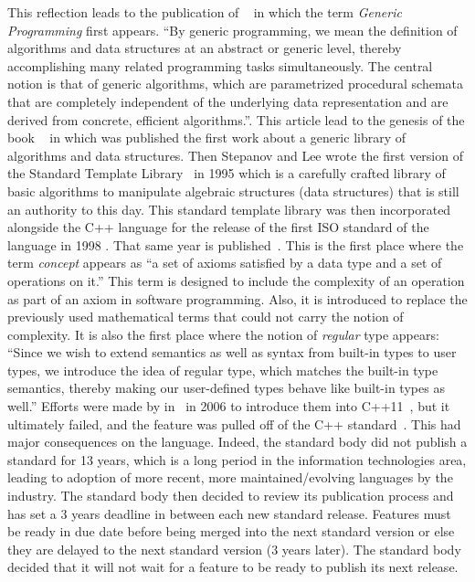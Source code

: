 This reflection leads to the publication of ~\parencite{musser.1988.generic} in which the
term \emph{Generic Programming} first appears. ``By generic programming, we mean the definition of algorithms and data
structures at an abstract or generic level, thereby accomplishing many related programming tasks simultaneously. The
central notion is that of generic algorithms, which are parametrized procedural schemata that are completely independent
of the underlying data representation and are derived from concrete, efficient algorithms.''. This article lead to the
genesis of the book ~\parencite{musser.1989.ada} in which was published the first work about
a generic library of algorithms and data structures. Then Stepanov and Lee wrote the first version of the Standard
Template Library~\parencite{stepanov.1995.standard} in 1995 which is a carefully crafted library of basic algorithms to
manipulate algebraic structures (data structures) that is still an authority to this day. This standard template library
was then incorporated alongside the C++ language for the release of the first ISO standard of the language in 1998
\parencite{iso.1998.cpp}. That same year is published~\parencite{dehnert.1998.fundamentals}. This is the first place
where the term \emph{concept} appears as ``a set of axioms satisfied by a data type and a set of operations on it.''
This term is designed to include the complexity of an operation as part of an axiom in software programming. Also, it is
introduced to replace the previously used mathematical terms that could not carry the notion of complexity. It is also
the first place where the notion of \emph{regular} type appears: ``Since we wish to extend semantics as well as syntax
from built-in types to user types, we introduce the idea of regular type, which matches the built-in type semantics,
thereby making our user-defined types behave like built-in types as well.'' Efforts were made by
\citeauthor{gregor.2006.concepts-art} in~\parencite{gregor.2006.concepts-proc,gregor.2006.concepts-art} in 2006 to
introduce them into C++11~\parencite{iso.2011.cpp}, but it ultimately failed, and the feature was pulled off of the C++
standard~\parencite{seymour.2009.concepts}. This had major consequences on the language. Indeed, the standard body did
not publish a standard for 13 years, which is a long period in the information technologies area, leading to adoption of
more recent, more maintained/evolving languages by the industry. The standard body then decided to review its
publication process and has set a 3 years deadline in between each new standard release. Features must be ready in due
date before being merged into the next standard version or else they are delayed to the next standard version (3 years
later). The standard body decided that it will not wait for a feature to be ready to publish its next release.


